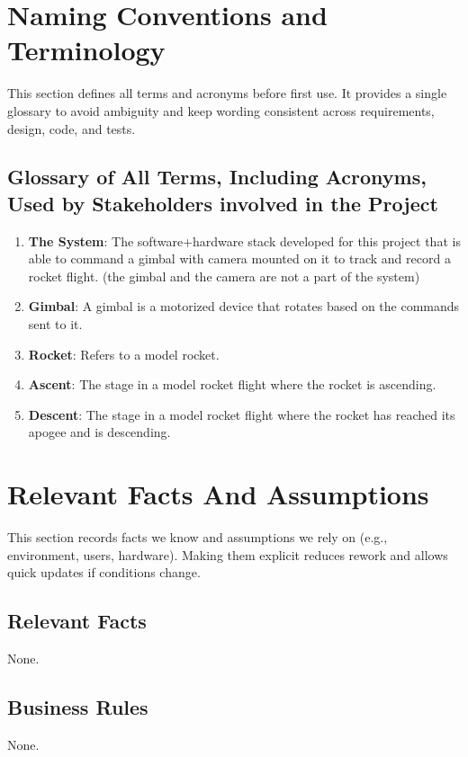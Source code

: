 \documentclass[12pt]{article}
\begin{document}
\section{Naming Conventions and Terminology}
This section defines all terms and acronyms before first use. It provides a
single glossary to avoid ambiguity and keep wording consistent across
requirements, design, code, and tests.
\subsection{Glossary of All Terms, Including Acronyms, Used by Stakeholders
  involved in the Project}

\begin{enumerate}
  \item \textbf{The System}: The software+hardware stack developed for this project that is able to command a gimbal with camera mounted on it to track and record a rocket flight. (the gimbal and the camera are not a part of the system)
  \item \textbf{Gimbal}: A gimbal is a motorized device that rotates based on the commands sent to it.
  \item \textbf{Rocket}: Refers to a model rocket.
  \item \textbf{Ascent}: The stage in a model rocket flight where the rocket is ascending.
  \item \textbf{Descent}: The stage in a model rocket flight where the rocket has reached its apogee and is descending.
\end{enumerate}

\section{Relevant Facts And Assumptions}
This section records facts we know and assumptions we rely on (e.g.,
environment, users, hardware). Making them explicit reduces rework and allows
quick updates if conditions change.

\subsection{Relevant Facts}

None.

\subsection{Business Rules}

None.
\end{document}
